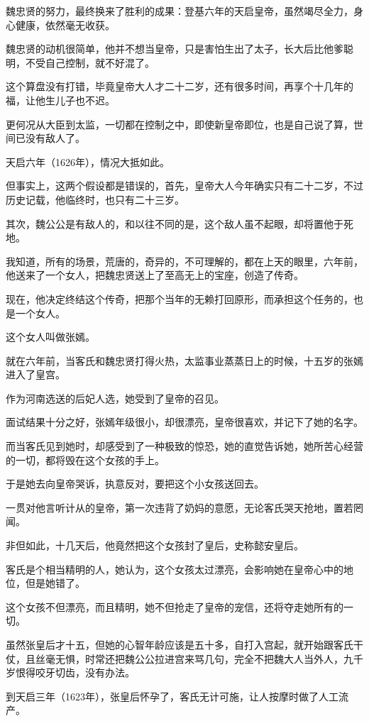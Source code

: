 \begin{multicols}{\theparacolNo}
魏忠贤的努力，最终换来了胜利的成果：登基六年的天启皇帝，虽然竭尽全力，身心健康，依然毫无收获。

魏忠贤的动机很简单，他并不想当皇帝，只是害怕生出了太子，长大后比他爹聪明，不受自己控制，就不好混了。

这个算盘没有打错，毕竟皇帝大人才二十二岁，还有很多时间，再享个十几年的福，让他生儿子也不迟。

更何况从大臣到太监，一切都在控制之中，即使新皇帝即位，也是自己说了算，世间已没有敌人了。

天启六年（1626年），情况大抵如此。

但事实上，这两个假设都是错误的，首先，皇帝大人今年确实只有二十二岁，不过历史记载，他临终时，也只有二十三岁。

其次，魏公公是有敌人的，和以往不同的是，这个敌人虽不起眼，却将置他于死地。

我知道，所有的场景，荒唐的，奇异的，不可理解的，都在上天的眼里，六年前，他送来了一个女人，把魏忠贤送上了至高无上的宝座，创造了传奇。

现在，他决定终结这个传奇，把那个当年的无赖打回原形，而承担这个任务的，也是一个女人。

这个女人叫做张嫣。

就在六年前，当客氏和魏忠贤打得火热，太监事业蒸蒸日上的时候，十五岁的张嫣进入了皇宫。

作为河南选送的后妃人选，她受到了皇帝的召见。

面试结果十分之好，张嫣年级很小，却很漂亮，皇帝很喜欢，并记下了她的名字。

而当客氏见到她时，却感受到了一种极致的惊恐，她的直觉告诉她，她所苦心经营的一切，都将毁在这个女孩的手上。

于是她去向皇帝哭诉，执意反对，要把这个小女孩送回去。

一贯对他言听计从的皇帝，第一次违背了奶妈的意愿，无论客氏哭天抢地，置若罔闻。

非但如此，十几天后，他竟然把这个女孩封了皇后，史称懿安皇后。

客氏是个相当精明的人，她认为，这个女孩太过漂亮，会影响她在皇帝心中的地位，但是她错了。

这个女孩不但漂亮，而且精明，她不但抢走了皇帝的宠信，还将夺走她所有的一切。

虽然张皇后才十五，但她的心智年龄应该是五十多，自打入宫起，就开始跟客氏干仗，且丝毫无惧，时常还把魏公公拉进宫来骂几句，完全不把魏大人当外人，九千岁恨得咬牙切齿，没有办法。

到天启三年（1623年），张皇后怀孕了，客氏无计可施，让人按摩时做了人工流产。


\end{multicols}
